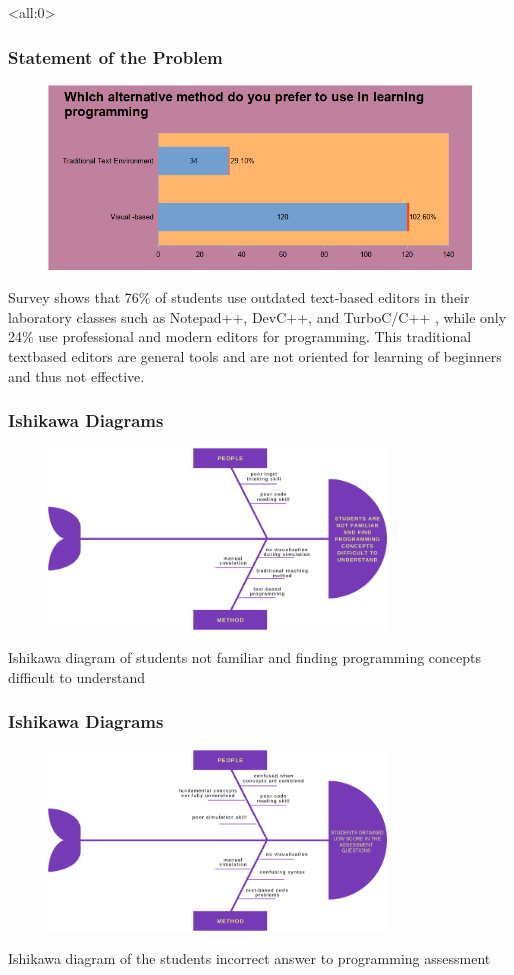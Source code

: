 \documentclass{beamer}
\newcommand{\parx}{
	\setlength{\parindent}{4em}
	\par}
\begin{document}
\begin{frame}<all:0>
	\frametitle{Statement of the Problem}
	\begin{figure}
		\includegraphics[scale=0.25]{results/10.png}
	\end{figure}

	\justifying
	\parx
	Survey shows that 76\% of students use outdated text-based editors in their
	laboratory classes such as Notepad++, DevC++, and TurboC/C++ , while only
	24\% use professional and modern editors for programming. This traditional
	textbased editors are general tools and are not oriented for learning of
	beginners and thus not effective.
\end{frame}

\begin{frame}
	\frametitle{Ishikawa Diagrams}
	\begin{figure}
		\includegraphics[width=0.8\textwidth]{figures/fishbone1.png}
	\end{figure}
	\centering
	Ishikawa diagram of students not familiar and finding programming concepts
	difficult to understand
\end{frame}

\begin{frame}
	\frametitle{Ishikawa Diagrams}
	\begin{figure}
		\includegraphics[width=0.8\textwidth]{figures/fishbone2.png}
	\end{figure}
	\centering
	Ishikawa diagram of the students incorrect answer to programming assessment
\end{frame}
\end{document}
